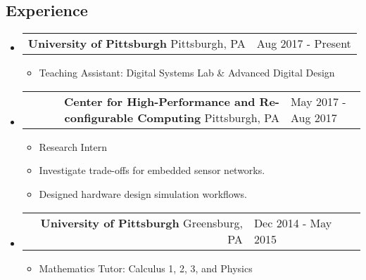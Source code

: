 \documentclass[18pt]{article}
\makeatletter
\providecommand{\tightlist}{
    \setlength{\itemsep}{0pt}\setlength{\parskip}{0pt}
}
\providecommand{\datetable}[2]{
    \begin{tabular*}{\textwidth}{@{}r @{\extracolsep{\fill}} l}
        #1 & #2
    \end{tabular*}
}
\makeatother
\begin{document}
      
    \subsection*{Experience}\label{experience}
        \begin{itemize}[label={}]
        \item \datetable{
            \textbf{University of Pittsburgh} \textbar{} Pittsburgh, PA
        }{Aug 2017 - Present}
        \begin{itemize}[topsep=0pt]
            \item Teaching Assistant: Digital Systems Lab \& Advanced Digital Design
        \end{itemize}
    
        \item \datetable{
            \textbf{Center for High-Performance and Re-configurable Computing} \textbar{} Pittsburgh, PA
        }{May 2017 - Aug 2017}
        \begin{itemize}[topsep=0pt]\tightlist
          \item Research Intern
          \item Investigate trade-offs for embedded sensor networks.
          \item Designed hardware design simulation workflows.
      	\end{itemize}
      

        \item \datetable{
            \textbf{University of Pittsburgh} \textbar{} 
            Greensburg, PA
        }{Dec 2014 - May 2015}
        \begin{itemize}[topsep=0pt]
            \item Mathematics Tutor: Calculus 1, 2, 3, and Physics
        \end{itemize}
        \end{itemize}
      
\end{document}
